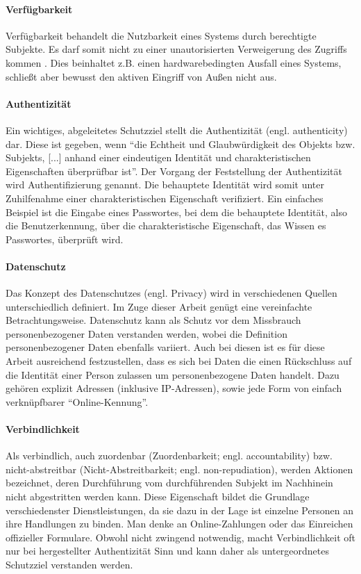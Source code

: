 \paragraph{Verfügbarkeit}
Verfügbarkeit behandelt die Nutzbarkeit eines Systems durch berechtigte Subjekte. Es darf somit nicht zu einer unautorisierten Verweigerung des Zugriffs kommen \cite[p. 12]{Eckert2013}. Dies beinhaltet z.B. einen hardwarebedingten Ausfall eines Systems, schließt aber bewusst den aktiven Eingriff von Außen nicht aus.
 
\paragraph{Authentizität}
Ein wichtiges, abgeleitetes Schutzziel stellt die Authentizität (engl. authenticity) dar. Diese ist gegeben, wenn \enquote{die Echtheit und Glaubwürdigkeit des Objekts bzw. Subjekts, [...] anhand einer eindeutigen Identität und charakteristischen Eigenschaften überprüfbar ist}\cite[p. 8]{Eckert2013}. Der Vorgang der Feststellung der Authentizität wird Authentifizierung genannt. Die behauptete Identität wird somit unter Zuhilfenahme einer charakteristischen Eigenschaft verifiziert. Ein einfaches Beispiel ist die Eingabe eines Passwortes, bei dem die behauptete Identität, also die Benutzerkennung, über die charakteristische Eigenschaft, das Wissen es Passwortes, überprüft wird.  

\paragraph{Datenschutz}
Das Konzept des Datenschutzes (engl. Privacy) wird in verschiedenen Quellen unterschiedlich definiert. Im Zuge dieser Arbeit genügt eine vereinfachte Betrachtungsweise. Datenschutz kann als Schutz vor dem Missbrauch personenbezogener Daten verstanden werden, wobei die Definition personenbezogener Daten ebenfalls variiert. Auch bei diesen ist es für diese Arbeit ausreichend festzustellen, dass es sich bei Daten die einen Rückschluss auf die Identität einer Person zulassen um personenbezogene Daten handelt. Dazu gehören explizit Adressen (inklusive IP-Adressen), sowie jede Form von einfach verknüpfbarer ``Online-Kennung''\cite{Schwenke2018}.     

\paragraph{Verbindlichkeit}
Als verbindlich, auch zuordenbar (Zuordenbarkeit; engl. accountability) bzw. nicht-abstreitbar (Nicht-Abstreitbarkeit; engl. non-repudiation), werden Aktionen bezeichnet, deren Durchführung vom durchführenden Subjekt im Nachhinein nicht abgestritten werden kann. Diese Eigenschaft bildet die Grundlage verschiedenster Dienstleistungen, da sie dazu in der Lage ist einzelne Personen an ihre Handlungen zu binden. Man denke an Online-Zahlungen oder das Einreichen offizieller Formulare. Obwohl nicht zwingend notwendig, macht Verbindlichkeit oft nur bei hergestellter Authentizität Sinn und kann daher als untergeordnetes Schutzziel verstanden werden.

